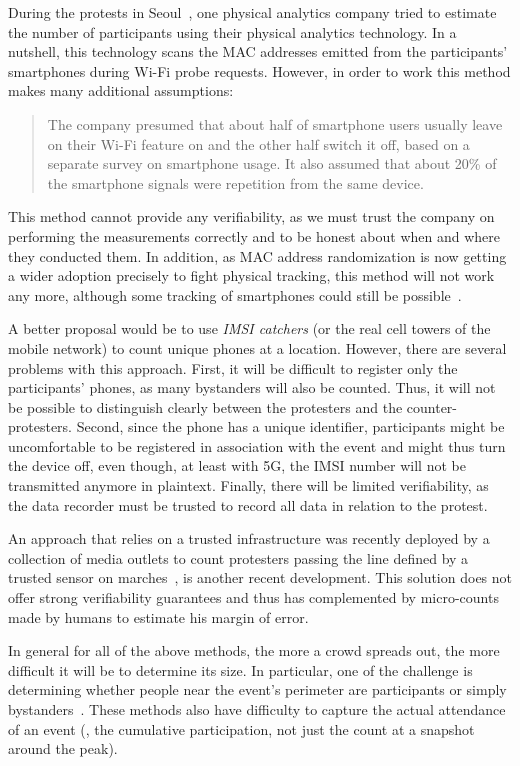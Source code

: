 During the protests in Seoul~\cite{2016DemonstrationsInSeoul}, one physical analytics company tried to estimate the number of participants using their physical analytics technology.
In a nutshell, this technology scans the MAC addresses emitted from the participants' smartphones during Wi-Fi probe requests.
However, in order to work this method makes many additional assumptions:
\blockcquote{2016DemonstrationsInSeoul}{%
The company presumed that about half of smartphone users usually leave on their Wi-Fi feature on and the other half switch it off, based on a separate survey on smartphone usage. 
It also assumed that about 20\% of the smartphone signals were repetition from the same device.
}
This method cannot provide any verifiability, as we must trust the company on performing the measurements correctly and to be honest about when and where they conducted them.
In addition, as MAC address randomization is now getting a wider adoption precisely to fight physical tracking, this method will not work any more, although some tracking of smartphones could still be possible~\cite{WhyMACRandomizationIsNotEnough}.

A better proposal would be to use \emph{IMSI catchers} (or the real cell towers of the mobile network) to count unique phones at a location.
However, there are several problems with this approach.
First, it will be difficult to register only the participants' phones, as many bystanders will also be counted.
Thus, it will not be possible to distinguish clearly between the protesters and the counter-protesters.
Second, since the phone has a unique identifier, participants might be uncomfortable to be registered in association with the event and might thus turn the device off, even though, at least with 5G, the IMSI number will not be transmitted anymore in plaintext. %
Finally, there will be limited verifiability, as the data recorder must be trusted to record all data in relation to the protest.

An approach that relies on a trusted infrastructure was recently deployed by a collection of media outlets to count protesters passing the line defined by a trusted sensor on marches~\cite{LeMondeProtestingSolution}, is another recent development. 
This solution does not offer strong verifiability guarantees and thus has complemented by micro-counts made by humans to estimate his margin of error.

In general for all of the above methods, the more a crowd spreads out, the more difficult it will be to determine its size.
In particular, one of the challenge is determining whether people near the event's perimeter are participants or simply bystanders~\cite{HowToEstimateCrowdSize}.
These methods also have difficulty to capture the actual attendance of an event (\ie, the cumulative participation, not just the count at a snapshot around the peak).

